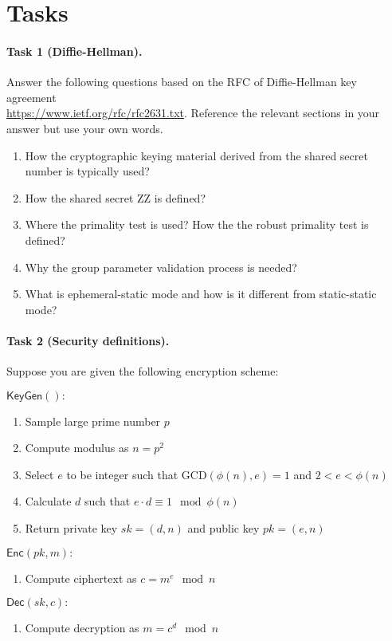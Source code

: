 \documentclass{article}
\begin{document}
\newpage

\section*{Tasks}

\paragraph{Task 1 (Diffie-Hellman).} Answer the following questions based on the RFC of Diffie-Hellman key agreement \\ \url{https://www.ietf.org/rfc/rfc2631.txt}. Reference the relevant sections in your answer but use your own words.
\begin{enumerate}
    \item How the cryptographic keying material derived from the shared secret number is typically used?
    \item How the shared secret ZZ is defined?
    \item Where the primality test is used? How the the robust primality test is defined?
    \item Why the group parameter validation process is needed?
    \item What is ephemeral-static mode and how is it different from static-static mode?
\end{enumerate}


\paragraph{Task 2 (Security definitions).} Suppose you are given the following encryption scheme:
\begin{tcolorbox}[colback=white]
\begin{multicols}{2}
$\mathsf{KeyGen}():$
\begin{enumerate}
    \item Sample large prime number $p$ 
    \item Compute modulus as $n = p^2$
    \item Select $e$ to be integer such that $\text{GCD}(\phi(n), e) = 1$ and $2 < e < \phi(n)$
    \item Calculate $d$ such that $e \cdot d \equiv 1 \mod \phi(n)$
    \item Return private key  $sk = (d,n)$ and public key $pk = (e,n)$
\end{enumerate}

\columnbreak
$\mathsf{Enc}(pk,m):$
\begin{enumerate}
    \item Compute ciphertext as $c = m^e \mod n$ 
\end{enumerate}

$\mathsf{Dec}(sk,c):$
\begin{enumerate}
    \item Compute decryption as $m = c^d \mod n$
\end{enumerate}
\end{multicols}
\end{tcolorbox}
\end{document}
